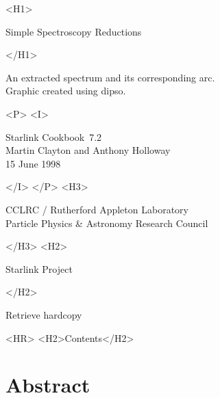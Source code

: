 \documentclass[twoside,11pt]{article}
\newcommand{\stardoccategory}  {Starlink Cookbook}
\newcommand{\stardocsource}    {sc\stardocnumber}
\newcommand{\stardocnumber}    {7.2}
\newcommand{\stardocauthors}   {Martin Clayton and Anthony Holloway}
\newcommand{\stardocdate}      {15 June 1998}
\newcommand{\stardoctitle}     {Simple Spectroscopy Reductions}
\newcommand{\htmladdnormallink}[2]{#1}
\newcommand{\htmladdimg}[1]{}
\newcommand{\htmlref}[2]{#1}
\newcommand{\htmladdtonavigation}[1]{}
\newcommand{\xref}[3]{#1}
\newcommand{\xlabel}[1]{}
\begin{document}
\begin{htmlonly}
   \xlabel{}
   \begin{rawhtml} <H1> \end{rawhtml}
      \stardoctitle\\
   \begin{rawhtml} </H1> \end{rawhtml}

   \begin{figure}[h]
   \epsfysize=100mm
   \end{figure}

   An extracted spectrum and its corresponding arc.\\
   Graphic created using \xref{{\sc dipso}}{sun50}{}\cite{dipso}.

   \begin{rawhtml} <P> <I> \end{rawhtml}
   \stardoccategory\ \stardocnumber \\
   \stardocauthors \\
   \stardocdate
   \begin{rawhtml} </I> </P> <H3> \end{rawhtml}
      \htmladdnormallink{CCLRC}{http://www.cclrc.ac.uk} /
      \htmladdnormallink{Rutherford Appleton Laboratory}
                        {http://www.cclrc.ac.uk/ral} \\
      \htmladdnormallink{Particle Physics \& Astronomy Research Council}
                        {http://www.pparc.ac.uk} \\
   \begin{rawhtml} </H3> <H2> \end{rawhtml}
      \htmladdnormallink{Starlink Project}{http://star-www.rl.ac.uk/}
   \begin{rawhtml} </H2> \end{rawhtml}
   \htmladdnormallink{\htmladdimg{source.gif} Retrieve hardcopy}
      {http://star-www.rl.ac.uk/cgi-bin/hcserver?\stardocsource}\\

  \label{stardoccontents}
  \begin{rawhtml}
    <HR>
    <H2>Contents</H2>
  \end{rawhtml}
  \htmladdtonavigation{\htmlref{\htmladdimg{contents_motif.gif}}
        {stardoccontents}}

  \section{\xlabel{abstract}Abstract}
\end{htmlonly}
\end{document}

